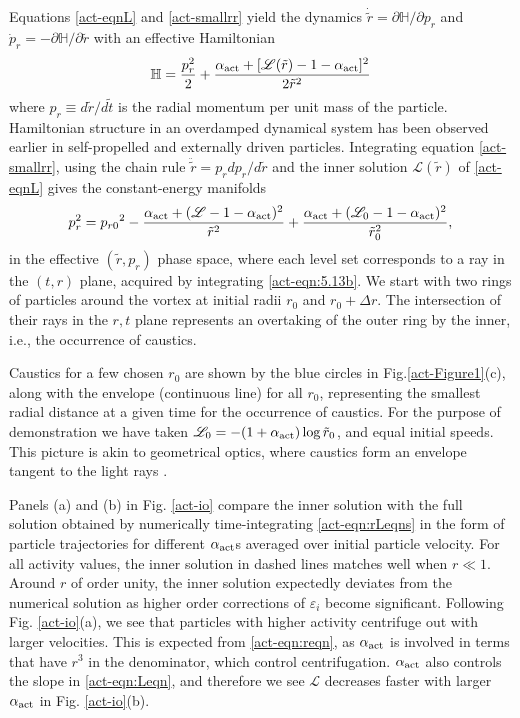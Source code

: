 \documentclass[../Rajarshi-thesis-draft.tex]{subfiles}
\begin{document}
Equations \eqref{act-eqnL} and \eqref{act-smallrr} yield the dynamics $\dot{\tilde{r}} = \partial \mathbb{H}/\partial p_r$ and $\dot{p}_r = -\partial \mathbb{H}/\partial \tilde{r}$ with an effective Hamiltonian
\begin{equation}
\mathbb{H} = \frac{p_r^{2}}{2} + \frac{\alpha_{\rm act} + [\mathscr{L}(\tilde{r}) - 1 -\alpha_{\rm act}]^2}{2 \tilde{r}^2}
\label{act-eqn:5.13}
\end{equation}
where $p_r \equiv d\tilde{r}/d\tilde{t}$ is the radial momentum per unit mass of the particle. Hamiltonian structure in an overdamped dynamical system has been observed earlier in self-propelled \cite{Stark2016, Lushi2015, Shelley2019, Arguedas_Leiva_2020, Ronojoy2020} and externally driven \cite{Chajwa2019, Chajwa2020} particles. Integrating equation \eqref{act-smallrr}, using the chain rule $\ddot{\tilde{r}} = p_r dp_r  / d\tilde{r}$ and the inner solution $\mathscr{L}(\tilde{r})$ of \eqref{act-eqnL} gives the constant-energy manifolds
\begin{equation}
p_r^{2} = {p_{r0}}^{2} -
\frac{\alpha_{\rm act} + (\mathscr{L} - 1 -\alpha_{\rm act})^2}{\tilde{r}^2} +
\frac{\alpha_{\rm act} + (\mathscr{L}_0 - 1 -\alpha_{\rm act})^2}{\tilde{r}_0^2},
\label{act-eqn:5.13b}
\end{equation}
in the effective $(\tilde{r}, p_r)$ phase space, where each level set corresponds to a ray in the $(t,r)$ plane, acquired by integrating \eqref{act-eqn:5.13b}. 
We start with two rings of particles around the vortex at initial radii $r_0$ and $r_0+\Delta r$. The intersection of their rays in the $r,t$ plane represents an overtaking of the outer ring by the inner, i.e., the occurrence of caustics.

Caustics for a few chosen $r_0$ are shown by the blue circles in Fig.\ref{act-Figure1}(c), along with the envelope (continuous line) for all $r_0$, representing the smallest radial distance at a given time for the occurrence of caustics. For the purpose of demonstration we have taken $\mathscr{L}_{0}= - (1+\alpha_{\rm act}) \log \tilde{r}_{0}$, and equal initial speeds. This picture is akin to geometrical optics, where caustics form an envelope tangent to the light rays \cite{eggers_fontelos_2015}. 

Panels (a) and (b) in Fig. \ref{act-io} compare the inner solution with the full solution obtained by numerically time-integrating \eqref{act-eqn:rLeqns} in the form of particle trajectories for different $\alpha_{\rm act}$s averaged over initial particle velocity.
For all activity values, the inner solution in dashed lines matches well when $r \ll 1$. Around $r$ of order unity, the inner solution expectedly deviates from the numerical solution as higher order corrections of $\varepsilon_i$ become significant. Following Fig. \ref{act-io}(a), we see that particles with higher activity centrifuge out with larger velocities. This is expected from \eqref{act-eqn:reqn}, as $\alpha_{\rm act}$ is involved in terms that have $r^3$ in the denominator, which control centrifugation. $\alpha_{\rm act}$ also controls the slope in \eqref{act-eqn:Leqn}, and therefore we see $\mathscr{L}$ decreases faster with larger $\alpha_{\rm act}$ in Fig. \ref{act-io}(b).
\end{document}
